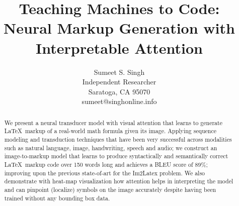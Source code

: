 \documentclass{article}
\title{Teaching Machines to Code:\\ Neural Markup Generation with Interpretable Attention}
\author{
	Sumeet S. Singh \\
	Independent Researcher \\
	Saratoga, CA 95070 \\
	sumeet@singhonline.info
}
\begin{document}
\newcommand{\xtm}{\ensuremath{\boldsymbol{x}_t}}
\newcommand{\htm}[1][t]{\ensuremath{\boldsymbol{h}_{#1} }}
\newcommand{\ctm}[1][t]{\ensuremath{\boldsymbol{c}_{#1} }}
\newcommand{\ztm}[1][t]{\ensuremath{\boldsymbol{z}_{#1} }}
\newcommand{\itm}[1][t]{\ensuremath{\boldsymbol{i}_{#1} }}
\newcommand{\otm}[1][t]{\ensuremath{\boldsymbol{o}_{#1} }}
\newcommand{\ftm}[1][t]{\ensuremath{\boldsymbol{f}_{#1} }}
\newcommand{\wtmat}[2]{W_{#1 #2}}

\maketitle

\begin{abstract}
	We present a neural transducer model with visual attention that learns to generate \LaTeX  ~markup of a real-world math formula given its image. Applying sequence modeling and transduction techniques that have been very successful across modalities such as natural language, image, handwriting, speech and audio; we construct an image-to-markup model that learns to produce syntactically and semantically correct \LaTeX ~markup code over 150 words long and achieves a BLEU score of 89\%; improving upon the previous state-of-art for the Im2Latex problem. We also demonstrate with heat-map visualization how attention helps in interpreting the model and can pinpoint (localize) symbols on the image accurately despite having been trained without any bounding box data.
\end{abstract}
\end{document}
